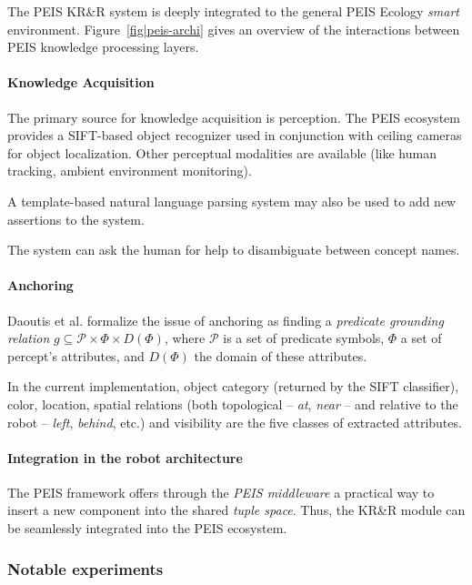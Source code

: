 \documentclass[a4paper, twocolumn]{article}
\begin{document}
The PEIS KR\&R system is deeply integrated to the general PEIS Ecology
\emph{smart} environment. Figure~\ref{fig|peis-archi} gives an overview of the
interactions between PEIS knowledge processing layers.

\paragraph{Knowledge Acquisition} The primary source for knowledge acquisition
is perception.  The PEIS ecosystem provides a SIFT-based object recognizer used
in conjunction with ceiling cameras for object localization.  Other perceptual
modalities are available (like human tracking, ambient environment monitoring).

A template-based natural language parsing system may also be used to add new
assertions to the system.

The system can ask the human for help to disambiguate between concept names.

\paragraph{Anchoring} Daoutis et al. formalize the issue of anchoring as
finding a \emph{predicate grounding relation} $g \subseteq \mathcal{P} \times
\Phi \times D(\Phi)$, where $\mathcal{P}$ is a set of predicate symbols, $\Phi$
a set of percept's attributes, and $D(\Phi)$ the domain of these attributes.

In the current implementation, object category (returned by the SIFT
classifier), color, location, spatial relations (both topological -- \emph{at},
\emph{near} -- and relative to the robot -- \emph{left}, \emph{behind}, etc.)
and visibility are the five classes of extracted attributes.

\paragraph{Integration in the robot architecture}
\label{sect|peis-integration}

The PEIS framework offers through the \emph{PEIS middleware} a practical way to
insert a new component into the shared \emph{tuple space}.  Thus, the KR\&R
module can be seamlessly integrated into the PEIS ecosystem.

\subsubsection{Notable experiments}
\label{sect|peis-expe}
\end{document}
